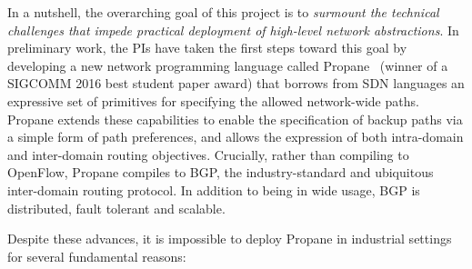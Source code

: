 In a nutshell, the overarching goal of this project is to {\em surmount the technical challenges that impede practical deployment of high-level network abstractions}.  In preliminary work, 
the PIs have taken the first steps toward this goal by developing a
new network programming language called Propane~\cite{beckett+:propane} (winner of a SIGCOMM 2016
best student paper award) that borrows from SDN languages an expressive set of primitives for specifying the allowed network-wide paths.  Propane extends these capabilities to enable the specification of backup paths via a simple form of path preferences, and allows the expression of both intra-domain 
and inter-domain routing objectives.  Crucially, rather than compiling to OpenFlow,
Propane compiles to BGP, the industry-standard and ubiquitous inter-domain routing protocol.  In addition to being in wide usage, BGP is distributed, fault tolerant and scalable.

Despite these advances, it is impossible to deploy Propane in industrial settings for several fundamental reasons:



